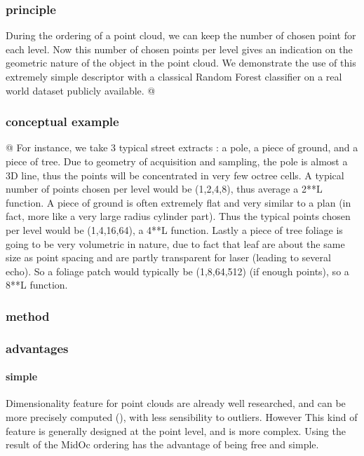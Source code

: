 		\subsubsection{principle}
			During the ordering of a point cloud, we can keep the number of chosen point for each level.
			Now this number of chosen points per level gives an indication on the geometric nature of the object in the point cloud. 
			We demonstrate the use of this extremely simple descriptor with a classical Random Forest classifier on a real world dataset publicly available.
			@
		\subsubsection{conceptual example}
			@
			For instance, we take 3 typical street extracts : a pole, a piece of ground, and a piece of tree.
			Due to geometry of acquisition and sampling, the pole is almost a 3D line, thus the points will be concentrated in very few octree cells.
			A typical number of points chosen per level would be (1,2,4,8), thus average a 2**L function.
			A piece of ground is often extremely flat and very similar to a plan (in  fact, more like a very large radius cylinder part).
			Thus the typical points chosen per level would be (1,4,16,64), a 4**L function.
			Lastly a piece of tree foliage is going to be very volumetric in nature, due to fact that leaf are about the same size as point spacing and are partly transparent for laser (leading to several echo).
			So a foliage patch would typically be (1,8,64,512) (if enough points), so a 8**L function.
			
		\subsubsection{method}	
		\subsubsection{advantages}
			\paragraph{simple}
				Dimensionality feature for point clouds are already well researched, and can be more precisely computed (\cite{Demantke2014}), with less sensibility to outliers. However This kind of feature is generally designed at the point level, and is more complex.
				Using the result of the MidOc ordering has the advantage of being free and simple. 

